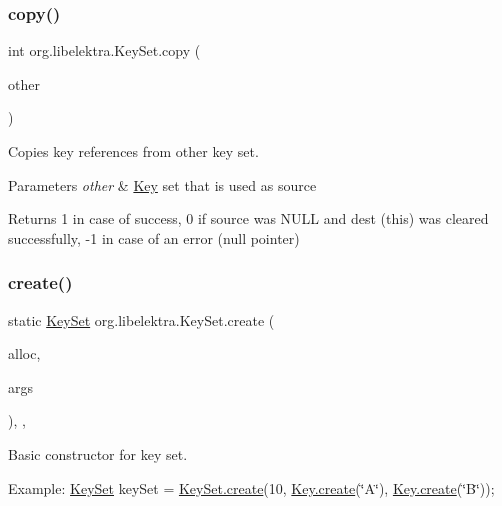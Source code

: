 \subsubsection{\texorpdfstring{copy()}{copy()}}
{\footnotesize\ttfamily int org.\+libelektra.\+Key\+Set.\+copy (\begin{DoxyParamCaption}\item[{final \hyperlink{classorg_1_1libelektra_1_1KeySet}{Key\+Set}}]{other }\end{DoxyParamCaption})\hspace{0.3cm}{\ttfamily [inline]}}



Copies key references from other key set. 


\begin{DoxyParams}{Parameters}
{\em other} & \hyperlink{classorg_1_1libelektra_1_1Key}{Key} set that is used as source \\
\hline
\end{DoxyParams}
\begin{DoxyReturn}{Returns}
1 in case of success, 0 if source was N\+U\+LL and dest (this) was cleared successfully, -\/1 in case of an error (null pointer) 
\end{DoxyReturn}
\mbox{\label{classorg_1_1libelektra_1_1KeySet_ae3f1cd9ac1a4fd2ef7d16e6c320bc6a3}} 
\subsubsection{\texorpdfstring{create()}{create()}\hspace{0.1cm}{\footnotesize\ttfamily [1/3]}}
{\footnotesize\ttfamily static \hyperlink{classorg_1_1libelektra_1_1KeySet}{Key\+Set} org.\+libelektra.\+Key\+Set.\+create (\begin{DoxyParamCaption}\item[{final int}]{alloc,  }\item[{final Object...}]{args }\end{DoxyParamCaption})\hspace{0.3cm}{\ttfamily [inline]}, {\ttfamily [static]}, {\ttfamily [protected]}}



Basic constructor for key set. 

Example\+: \hyperlink{classorg_1_1libelektra_1_1KeySet}{Key\+Set} key\+Set = \hyperlink{classorg_1_1libelektra_1_1KeySet_ae3f1cd9ac1a4fd2ef7d16e6c320bc6a3}{Key\+Set.\+create}(10, \hyperlink{classorg_1_1libelektra_1_1Key_af407cf43625618af4e7fb2576037fcfc}{Key.\+create}(\char`\"{}\+A\char`\"{}), \hyperlink{classorg_1_1libelektra_1_1Key_af407cf43625618af4e7fb2576037fcfc}{Key.\+create}(\char`\"{}\+B\char`\"{}));


